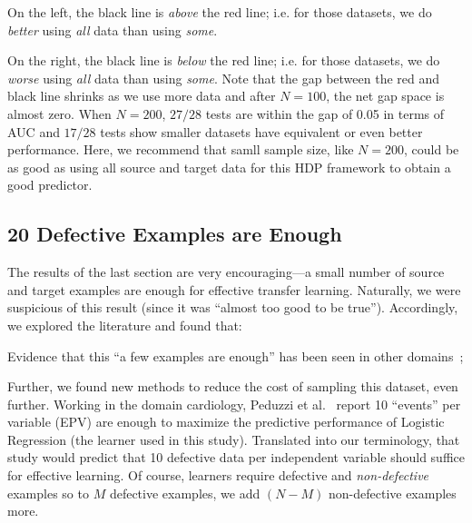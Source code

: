 \squishlist
\item
  On the left, the black line is
  {\em above} the red line; i.e. for those datasets, we do {\em better} using
  {\em all} data than using {\em some}.
  \item
On the right, the black line is {\em below} the red
line; i.e. for those datasets, we do {\em worse}
using {\em all} data than using {\em some}.
\squishend
Note that the gap between the red and black line
shrinks as we use more data and after $N=100$, the
net gap space is almost zero.  When $N=200$, $27/28$
tests are within the gap of 0.05 in terms of AUC and
$17/28$ tests show smaller datasets have equivalent
or even better performance. Here, we recommend that
samll sample size, like $N=200$, could be as good as using all source and target data for this HDP framework to obtain a good predictor.






\subsection{20 Defective Examples  are Enough}


The results of the last section are very encouraging---a small number of source
and target examples are enough for effective transfer learning. Naturally,
we were suspicious of this result (since it was ``almost too good to be true'').
Accordingly, we explored the literature and found that:
\squishlist
    \item Evidence that this ``a few examples are enough'' has been seen in other domains~\cite{peduzzi1996simulation}; 
    \item Further, we found new methods to reduce the cost of sampling this dataset, even further. 
\squishend
Working in the domain cardiology,
  Peduzzi et al.~\cite{peduzzi1996simulation}
  report 10 ``events'' per variable (EPV) are enough to maximize the predictive performance
  of  Logistic Regression (the learner used in this study). Translated into our terminology,
  that study would predict that  10 defective data per independent variable should
  suffice for effective learning. Of course, learners require defective and {\em non-defective}
  examples so to $M$ defective examples, we add $(N-M)$ non-defective examples more.

